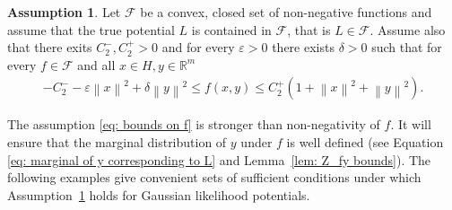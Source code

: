 \documentclass{amsart}
\theoremstyle{definition}
\newtheorem{assumption}{Assumption}
\newcommand{\R}{{\mathbb R}}
\newcommand{\norm}[1]{\left\|#1\right\|}
\newcommand{\F}{\mathcal{F}}
\begin{document}
\begin{assumption}\label{ass: assumption}
     Let $\F$ be a convex, closed set of non-negative functions and assume that the true potential $L$ is contained in $\F$, that is $L \in \F$. Assume also that there exits $C_2^-, C_2^+ > 0$ and for every $\varepsilon > 0$ there exists $\delta >0$ such that for every $f \in \F$ and all $x \in H, y \in \R^m$
        \begin{eqnarray}\label{eq: bounds on f}
             -C_2^- - \varepsilon \norm{x}^2   +\delta \norm{y}^2 \le f(x, y) \le C_2^+  (1 + \norm{x}^2   +\norm{y}^2).
        \end{eqnarray}
\end{assumption}
The assumption \eqref{eq: bounds on f} is stronger than non-negativity of $f$. It will ensure that the marginal distribution of $y$ under $f$ is well defined (see Equation \eqref{eq: marginal of y corresponding to L} and Lemma~\ref{lem: Z_fy bounds}).
The following examples give convenient sets of sufficient conditions under which Assumption~\ref{ass: assumption} holds for Gaussian likelihood potentials.
\end{document}
